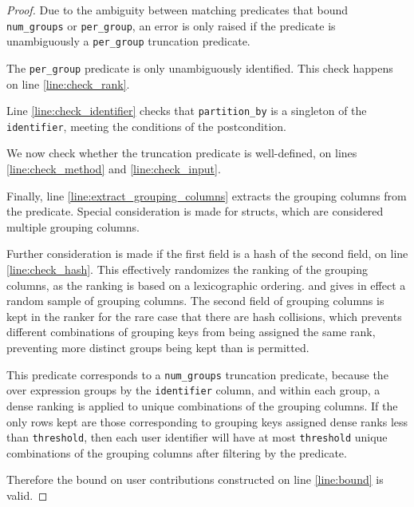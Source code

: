 \documentclass{article}
\begin{document}
\begin{proof}
    Due to the ambiguity between matching predicates that bound \texttt{num\_groups} or \texttt{per\_group},
    an error is only raised if the predicate is unambiguously a \texttt{per\_group} truncation predicate.
    
    The \texttt{per\_group} predicate is only unambiguously identified.
    This check happens on line \ref{line:check_rank}.

    Line \ref{line:check_identifier} checks that \texttt{partition\_by} is a singleton of the \texttt{identifier}, meeting the conditions of the postcondition.

    We now check whether the truncation predicate is well-defined, on lines \ref{line:check_method} and \ref{line:check_input}.

    Finally, line \ref{line:extract_grouping_columns} extracts the grouping columns from the predicate.
    Special consideration is made for structs, which are considered multiple grouping columns.
    
    Further consideration is made if the first field is a hash of the second field, on line \ref{line:check_hash}.
    This effectively randomizes the ranking of the grouping columns, as the ranking is based on a lexicographic ordering.
    and gives in effect a random sample of grouping columns.
    The second field of grouping columns is kept in the ranker for the rare case that there are hash collisions,
    which prevents different combinations of grouping keys from being assigned the same rank, 
    preventing more distinct groups being kept than is permitted.

    This predicate corresponds to a \texttt{num\_groups} truncation predicate,
    because the over expression groups by the \texttt{identifier} column,
    and within each group, a dense ranking is applied to unique combinations of the grouping columns.
    If the only rows kept are those corresponding to grouping keys assigned dense ranks less than \texttt{threshold},
    then each user identifier will have at most \texttt{threshold} unique combinations of the grouping columns
    after filtering by the predicate.

    Therefore the bound on user contributions constructed on line \ref{line:bound} is valid.
\end{proof}
\end{document}
